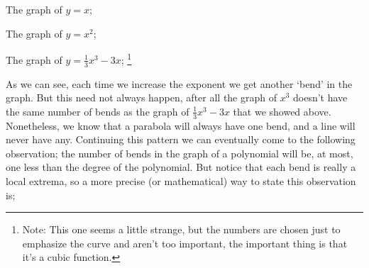 \documentclass{ximeraXloud}
\begin{document}
\begin{description}
    \item The graph of $y = x$;\\
\newpage
\item The graph of $y = x^2$;\\
\item The graph of $y = \frac{1}{3}x^3 - 3x$; \footnote{Note: This one seems a little strange, but the numbers are chosen just to emphasize the curve and aren't too important, the important thing is that it's a cubic function.}\\
\end{description}

As we can see, each time we increase the exponent we get another `bend' in the graph. But this need not always happen, after all the graph of $x^3$ doesn't have the same number of bends as the graph of $\frac{1}{3}x^3 - 3x$ that we showed above. Nonetheless, we know that a parabola will always have one bend, and a line will never have any. Continuing this pattern we can eventually come to the following observation; the number of bends in the graph of a polynomial will be, at most, one less than the degree of the polynomial. But notice that each bend is really a local extrema, so a more precise (or mathematical) way to state this observation is;
\end{document}
